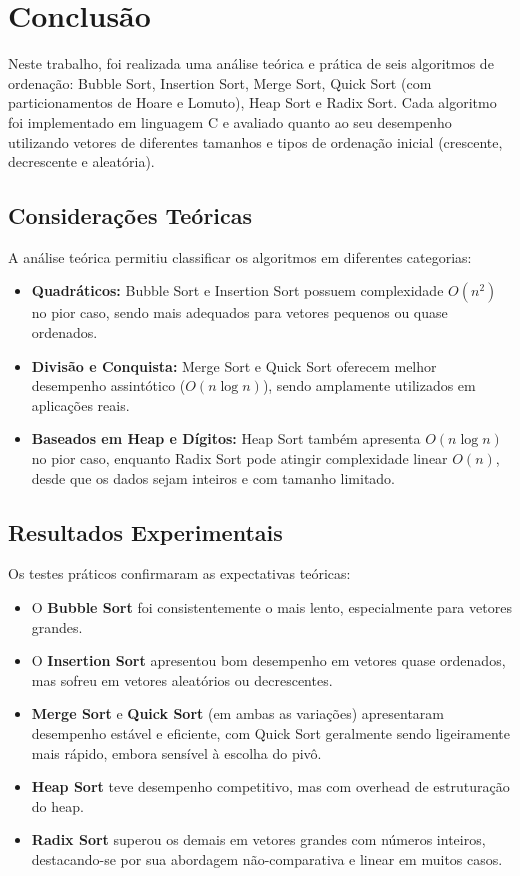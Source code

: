 \section{Conclusão}

Neste trabalho, foi realizada uma análise teórica e prática de seis algoritmos de ordenação: Bubble Sort, Insertion Sort, Merge Sort, Quick Sort (com particionamentos de Hoare e Lomuto), Heap Sort e Radix Sort. Cada algoritmo foi implementado em linguagem C e avaliado quanto ao seu desempenho utilizando vetores de diferentes tamanhos e tipos de ordenação inicial (crescente, decrescente e aleatória).

\subsection*{Considerações Teóricas}

A análise teórica permitiu classificar os algoritmos em diferentes categorias:

\begin{itemize}
    \item \textbf{Quadráticos:} Bubble Sort e Insertion Sort possuem complexidade \(O(n^2)\) no pior caso, sendo mais adequados para vetores pequenos ou quase ordenados.
    \item \textbf{Divisão e Conquista:} Merge Sort e Quick Sort oferecem melhor desempenho assintótico (\(O(n \log n)\)), sendo amplamente utilizados em aplicações reais.
    \item \textbf{Baseados em Heap e Dígitos:} Heap Sort também apresenta \(O(n \log n)\) no pior caso, enquanto Radix Sort pode atingir complexidade linear \(O(n)\), desde que os dados sejam inteiros e com tamanho limitado.
\end{itemize}

\subsection*{Resultados Experimentais}

Os testes práticos confirmaram as expectativas teóricas:

\begin{itemize}
    \item O \textbf{Bubble Sort} foi consistentemente o mais lento, especialmente para vetores grandes.
    \item O \textbf{Insertion Sort} apresentou bom desempenho em vetores quase ordenados, mas sofreu em vetores aleatórios ou decrescentes.
    \item \textbf{Merge Sort} e \textbf{Quick Sort} (em ambas as variações) apresentaram desempenho estável e eficiente, com Quick Sort geralmente sendo ligeiramente mais rápido, embora sensível à escolha do pivô.
    \item \textbf{Heap Sort} teve desempenho competitivo, mas com overhead de estruturação do heap.
    \item \textbf{Radix Sort} superou os demais em vetores grandes com números inteiros, destacando-se por sua abordagem não-comparativa e linear em muitos casos.
\end{itemize}

